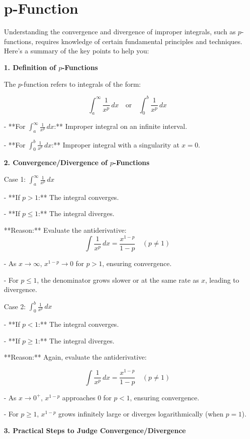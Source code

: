 \documentclass[a4paper,12pt]{book}
\begin{document}
\section{p-Function}

Understanding the convergence and divergence of improper integrals, such as \( p \)-functions, requires knowledge of certain fundamental principles and techniques. Here's a summary of the key points to help you:

\textbf{1. Definition of \( p \)-Functions}

The \( p \)-function refers to integrals of the form:

\[
\int_a^{\infty} \frac{1}{x^p} \, dx \quad \text{or} \quad \int_0^b \frac{1}{x^p} \, dx
\]

- **For \( \int_a^{\infty} \frac{1}{x^p} \, dx \):** Improper integral on an infinite interval.

- **For \( \int_0^b \frac{1}{x^p} \, dx \):** Improper integral with a singularity at \( x = 0 \).


\textbf{2. Convergence/Divergence of \( p \)-Functions}

Case 1: \( \int_a^{\infty} \frac{1}{x^p} \, dx \)

- **If \( p > 1 \):** The integral converges.

- **If \( p \leq 1 \):** The integral diverges.

**Reason:** Evaluate the antiderivative:
\[
\int \frac{1}{x^p} \, dx = \frac{x^{1-p}}{1-p} \quad (p \neq 1)
\]

- As \( x \to \infty \), \( x^{1-p} \to 0 \) for \( p > 1 \), ensuring convergence.

- For \( p \leq 1 \), the denominator grows slower or at the same rate as \( x \), leading to divergence.


Case 2: \( \int_0^b \frac{1}{x^p} \, dx \)

- **If \( p < 1 \):** The integral converges.

- **If \( p \geq 1 \):** The integral diverges.

**Reason:** Again, evaluate the antiderivative:

\[
\int \frac{1}{x^p} \, dx = \frac{x^{1-p}}{1-p} \quad (p \neq 1)
\]

- As \( x \to 0^+ \), \( x^{1-p} \) approaches \( 0 \) for \( p < 1 \), ensuring convergence.

- For \( p \geq 1 \), \( x^{1-p} \) grows infinitely large or diverges logarithmically (when \( p = 1 \)).

\textbf{3. Practical Steps to Judge Convergence/Divergence}
\end{document}
